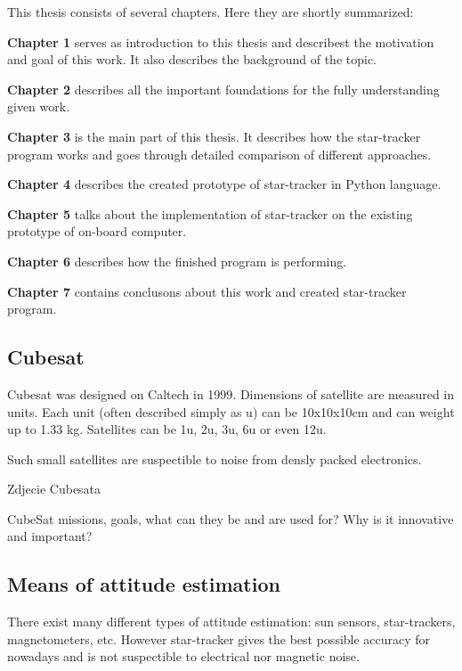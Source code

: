 \documentclass[12pt,a4paper,oneside]{article}
\begin{document}
This thesis consists of several chapters. Here they are shortly summarized:\par
\setlength{\parindent}{0cm}
\textbf{Chapter 1} serves as introduction to this thesis and describest the motivation and goal of this work. It also describes the background of the topic.\par
\textbf{Chapter 2} describes all the important foundations for the fully understanding given work.\par
\textbf{Chapter 3} is the main part of this thesis. It describes how the star-tracker program works and goes through detailed comparison of different approaches.\par
\textbf{Chapter 4} describes the created prototype of star-tracker in Python language.\par
\textbf{Chapter 5} talks about the implementation of star-tracker on the existing prototype of on-board computer.\par
\textbf{Chapter 6} describes how the finished program is performing.\par
\textbf{Chapter 7} contains conclusons about this work and created star-tracker program.\par

\setlength{\parindent}{1cm}

\subsection{Cubesat}


Cubesat was designed on Caltech in 1999\cite{heidt2000cubesat}.
Dimensions of satellite are measured in units. Each unit (often described simply as u) can be 10x10x10cm and can weight up to 1.33 kg. Satellites can be 1u, 2u, 3u, 6u or even 12u.

Such small satellites are suspectible to noise from densly packed electronics.

Zdjecie Cubesata

CubeSat missions, goals, what can they be and are used for? Why is it innovative and important?

\subsection{Means of attitude estimation}

There exist many different types of attitude estimation: sun sensors, star-trackers, magnetometers, etc. However star-tracker gives the best possible accuracy for nowadays and is not suspectible to electrical nor magnetic noise.
\end{document}
